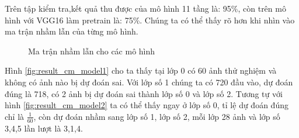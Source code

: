 Trên tập kiểm tra,kết quả thu được của mô hình 11 tầng là: 95\%, còn trên mô hình với VGG16 làm pretrain là: 75\%. Chúng ta có thể thấy rõ hơn khi nhìn vào ma trận nhầm lẫn của từng mô hình.
\begin{figure}[H]
\begin{center}
\hspace{0.3cm}
\end{center}
\caption{Ma trận nhầm lẫn cho các mô hình}
\end{figure}
Hình \ref{fig:result_cm_model1} cho ta thấy tại lớp 0 có 60 ảnh thử nghiệm và không có ảnh nào bị dự đoán sai. Với lớp số 1 chúng ta có 720 đầu vào, dự đoán đúng là 718, có 2 ảnh bị dự đoán sai thành  lớp số 0 và lớp số 2. Tương tự với hình \ref{fig:result_cm_model2} ta có thể thấy ngay ở lớp số 0, tỉ lệ dự đoán đúng chỉ là $\frac{1}{60}$, còn dự đoán nhầm sang lớp số 1, lớp số 2, mỗi lớp 28 ảnh và lớp số 3,4,5 lần lượt là 3,1,4.
